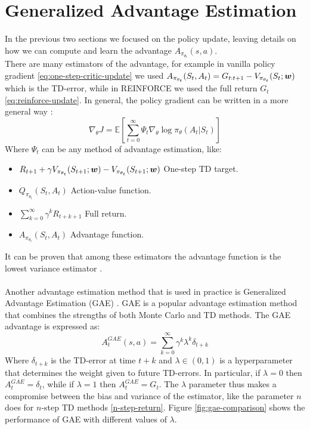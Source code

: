 \section{Generalized Advantage Estimation}
In the previous two sections we focused on the policy update, leaving details on how we can compute and learn the advantage $A_{\pi_{\theta_t}}(s, a)$.\\
There are many estimators of the advantage, for example in vanilla policy gradient \eqref{eq:one-step-critic-update} we used $A_{\pi_{\theta_t}}(S_t, A_t) = G_{t:t+1} - V_{\pi_{\theta_t}}(S_t; \boldsymbol{w})$ which is the TD-error, while in REINFORCE we used the full return $G_t$ \ref{eq:reinforce-update}. In general, the policy gradient can be written in a more general way \cite{schulman2015high}:
\begin{equation}
    \nabla_\theta J = \mathbb{E} \left[ \sum_{t=0}^{\infty} \Psi_t \nabla_\theta \log \pi_{\theta}(A_t|S_t) \right]
\end{equation}
Where $\Psi_t$ can be any method of advantage estimation, like:
\begin{itemize}
    \item $R_{t+1} + \gamma V_{\pi_{\theta_t}}(S_{t+1}; \boldsymbol{w}) - V_{\pi_{\theta_t}}(S_{t+1}; \boldsymbol{w})$ One-step TD target.
    \item $Q_{\pi_{\theta_t}}(S_t, A_t)$ Action-value function.
    \item $\sum_{k=0}^{\infty} \gamma^k R_{t+k+1}$ Full return.
    \item $A_{\pi_{\theta_t}}(S_t, A_t)$ Advantage function.
\end{itemize}
It can be proven that among these estimators the advantage function is the lowest variance estimator \cite{greensmith2004variance}.\\\\
Another advantage estimation method that is used in practice is Generalized Advantage Estimation (GAE) \cite{schulman2015high}. GAE is a popular advantage estimation method that combines the strengths of both Monte Carlo and TD methods. The GAE advantage is expressed as:
\begin{equation}
    A_{t}^{GAE}(s, a) = \sum_{k=0}^{\infty} \gamma^k \lambda^k \delta_{t+k}
    \label{eq:gae-advantage}
\end{equation}
Where $\delta_{t+k}$ is the TD-error at time $t+k$ and $\lambda \in (0, 1)$ is a hyperparameter that determines the weight given to future TD-errors. In particular, if $\lambda = 0$ then $A_t^{GAE} = \delta_t$, while if $\lambda = 1$ then $A_t^{GAE} = G_t$. The $\lambda$ parameter thus makes a compromise between the bias and variance of the estimator, like the parameter $n$ does for $n$-step TD methods \ref{n-step-return}. Figure \ref{fig:gae-comparison} shows the performance of GAE with different values of $\lambda$.\\
